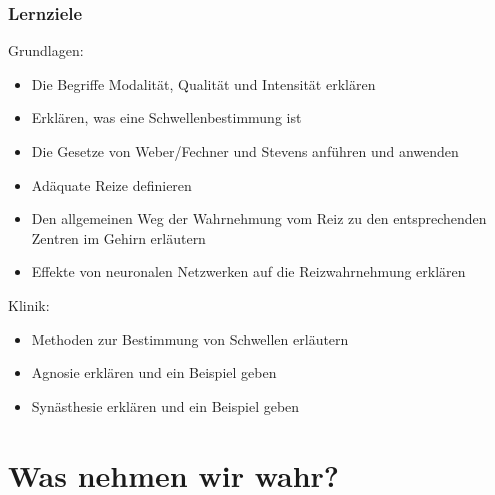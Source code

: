 \documentclass[aspectratio=169]{beamer}
\begin{document}
\begin{frame}

 \frametitle{Lernziele}



\begin{block}{Grundlagen:}




\begin{itemize}

    \item 
Die Begriffe Modalität, Qualität und Intensität erklären
    \item 
Erklären, was eine Schwellenbestimmung ist 
    \item 
Die Gesetze von Weber/Fechner und Stevens anführen und anwenden
    \item 
Adäquate Reize definieren
    \item 
Den allgemeinen Weg der Wahrnehmung vom Reiz zu den entsprechenden Zentren im Gehirn erläutern 
    \item 
Effekte von neuronalen Netzwerken auf die Reizwahrnehmung erklären
\end{itemize}


\end{block}



 

\begin{block}{Klinik:}

\begin{itemize}
    
\item 
Methoden zur Bestimmung von Schwellen erläutern 
\item
Agnosie erklären und ein Beispiel geben
\item
Synästhesie erklären und ein Beispiel geben


\end{itemize}


\end{block}



\end{frame}



 

\section{Was nehmen wir wahr?}
\end{document}
